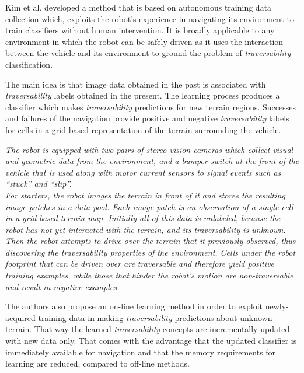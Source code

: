 \documentclass[12pt,a4paper]{report}
\newcommand{\example}{\enquote}
\newcommand{\term}{\textit}
\begin{document}
	
	
	
	
	Kim et al. \cite{Kim} developed a method 
	that is based on autonomous training data collection which, exploits the 
	robot’s experience in navigating its environment to train classifiers without 
	human intervention. It is broadly applicable to any environment in which 
	the robot can be safely driven as it uses the interaction between the vehicle
	and its environment to ground the problem of \term{traversability} classification.
	
	The main idea is that image data  obtained in the past is associated with 
	\term{traversability} labels obtained in the  present. The learning process produces a 
	classifier which makes \term{traversability}  predictions for new terrain regions. 
	Successes and failures of the navigation provide positive and negative 
	\term{traversability} labels for cells in a grid-based representation of the terrain surrounding 
	the vehicle.
	
	\textit{The robot is equipped with two pairs of stereo vision cameras which 
	collect visual and geometric data from the environment, and a bumper switch
	at the front of the vehicle that is used along with motor current sensors to 
	signal events such as \example{stuck} and \example{slip}.
	\\
	For starters, the robot images the terrain in front of it and stores the 
	resulting image patches in a data pool. Each image patch is an observation 
	of a single cell in a grid-based terrain map. Initially all of this data is 
	unlabeled, because the robot has not yet interacted with the terrain, and its 
	\term{traversability} is unknown. 
	\\
	Then the robot attempts to drive over the terrain that it previously 
	observed, thus discovering the \term{traversability} properties of the environment. 
	Cells under the robot footprint that can be driven over are traversable and 
	therefore yield positive training examples, while those that hinder the robot’s 
	motion are non-traversable	and result in negative examples.}
	
	The authors also propose an on-line learning method in order to exploit 
	newly-acquired training data in making \term{traversability} predictions about 
	unknown terrain. That way the learned \term{traversability} concepts are 
	incrementally updated with new data only. That comes with the advantage that the 
	updated classifier is immediately available for navigation and that the 
	memory requirements for learning are reduced, compared to off-line methods.
	\\
	
\end{document}
